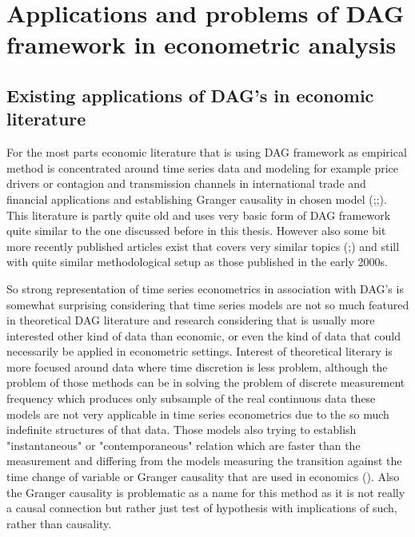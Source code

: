\documentclass[main=english,12pt,a4paper,pdftex,econ,utf8]{aaltothesis}
\begin{document}
\clearpage

\section{Applications and problems of DAG framework in econometric analysis}

\subsection{Existing applications of DAG's in economic literature}

For the most parts economic literature that is using DAG framework as empirical method is concentrated around time series data and modeling for example price drivers or contagion and transmission channels in international trade and financial applications and establishing Granger causality in chosen model (\cite{Awokuse2003};\cite{Bessler2003};\cite{Yang2006}). This literature is partly quite old and uses very basic form of DAG framework quite similar to the one discussed before in this thesis. However also some bit more recently published articles exist that covers very similar topics (\cite{Jayech2016};\cite{Ji2018}) and still with quite  similar methodological setup as those published in the early 2000s. 

So strong representation of time series econometrics in association with DAG's is somewhat surprising considering that time series models are not so much featured in theoretical DAG literature and research considering that is usually more interested other kind of data than economic, or even the kind of data that could necessarily be applied in econometric settings. Interest of theoretical literary is more focused around data where time discretion is less problem, although the problem of those methods can be in solving the problem of discrete measurement frequency which produces only subsample of the real continuous data these models are not very applicable in time series econometrics due to the so much indefinite structures of that data. Those models also trying to establish "instantaneous" or "contemporaneous" relation which are faster than the measurement and differing from the models measuring the transition against the time change of variable or Granger causality that are used in economics (\cite{Hyttinen2017}). Also the Granger causality is problematic as a name for this method as it is not really a causal connection but rather just test of hypothesis with implications of such, rather than causality.



\clearpage

\printbibliography
\end{document}
